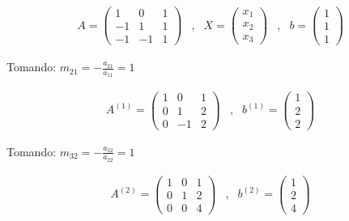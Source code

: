 \begin{equation*}
    \begin{matrix}
        A=\begin{pmatrix}
            1 & 0 & 1 \\
            -1 & 1 & 1 \\
            -1 & -1 & 1
        \end{pmatrix}
        & , &
        X=\begin{pmatrix}
            x_1 \\
            x_2 \\
            x_3
        \end{pmatrix} 
        & , &
        b=\begin{pmatrix}
            1 \\
            1 \\
            1
        \end{pmatrix}
    \end{matrix}
\end{equation*}

Tomando: $m_{21}=-\frac{a_{21}}{a_{11}}=1$

\begin{equation*}
    \begin{matrix}
        A^{(1)}= \begin{pmatrix}
            1 & 0 & 1 \\
            0 & 1 & 2 \\
            0 & -1 & 2
        \end{pmatrix}
        & , &
        b^{(1)}=\begin{pmatrix}
            1 \\
            2 \\
            2
        \end{pmatrix}
    \end{matrix}
\end{equation*}

Tomando: $m_{32}=-\frac{a_{32}}{a_{22}}=1$

\begin{equation*}
    \begin{matrix}
        A^{(2)}= \begin{pmatrix}
            1 & 0 & 1 \\
            0 & 1 & 2 \\
            0 & 0 & 4
        \end{pmatrix}
        & , &
        b^{(2)}=\begin{pmatrix}
            1 \\
            2 \\
            4
        \end{pmatrix}
    \end{matrix}
\end{equation*}

